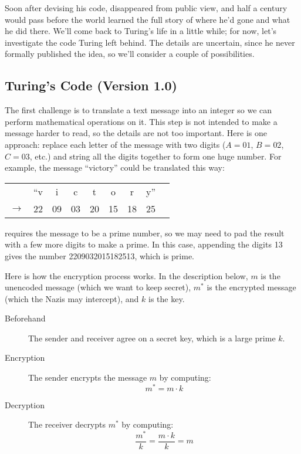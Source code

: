 Soon after devising his code,  disappeared from public view,
and half a century would pass before the world learned the full story of
where he'd gone and what he did there.  We'll come back to Turing's life
in a little while; for now, let's investigate the code Turing left behind.
The details are uncertain, since he never formally published the idea, so
we'll consider a couple of possibilities.

\subsection{Turing's Code (Version 1.0)}

The first challenge is to translate a text message into an integer so
we can perform mathematical operations on it.  This step is not
intended to make a message harder to read, so the details are not too
important.  Here is one approach: replace each letter of the message
with two digits ($A = 01$, $B = 02$, $C = 03$, etc.) and string all
the digits together to form one huge number.  For example, the message
``victory'' could be translated this way:
%
\begin{center}
\begin{tabular}{ccccccccc}
   &``v &  i &  c &  t & o & r & y'' \\
$\rightarrow$ & 22 & 09 & 03 & 20 & 15 & 18 & 25
\end{tabular}
\end{center}
%
 requires the message to be a prime number, so we may
need to pad the result with a few more digits to make a prime.  In
this case, appending the digits 13 gives the number 2209032015182513,
which is prime.

Here is how the encryption process works.  In the description
below, $m$ is the unencoded message (which we want to keep secret),
$m^*$ is the encrypted message (which the Nazis may intercept), and
$k$ is the key.

\begin{description}

\item[Beforehand] The sender and receiver agree on a secret key, which
is a large prime $k$.

\item[Encryption] The sender encrypts the message $m$ by computing:
\[
m^* = m \cdot k
\]

\item[Decryption] The receiver decrypts $m^*$ by computing:
\[
\frac{m^*}{k} = \frac{m \cdot k}{k} = m
\]

\end{description}

